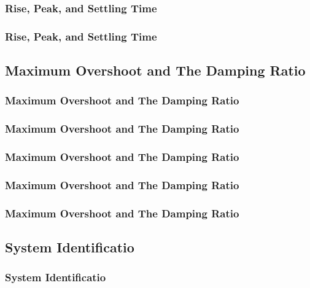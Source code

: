\documentclass[fleqn]{beamer} %
\newcommand{\sectionIVsubsectionIItitle}{Rise, Peak, and Settling Time}
\newcommand{\sectionIVsubsectionIIItitle}{Maximum Overshoot and The Damping Ratio}
\newcommand{\sectionIVsubsectionIVtitle}{System Identificatio}
\begin{document}
			\begin{frame}
				\frametitle{\sectionIVsubsectionIItitle}
				\bigskip


				\btVFill
			\end{frame}

			\begin{frame}
				\frametitle{\sectionIVsubsectionIItitle}
				\bigskip


				\btVFill
			\end{frame}

		\subsection{\sectionIVsubsectionIIItitle}\label{sectionIVsubsectionIV}

			\begin{frame}
				\frametitle{\sectionIVsubsectionIIItitle}
				\bigskip

				\btVFill
			\end{frame}

			\begin{frame}
				\frametitle{\sectionIVsubsectionIIItitle}
				\bigskip

			
				\btVFill
			\end{frame}

			\begin{frame}
				\frametitle{\sectionIVsubsectionIIItitle}
				\bigskip


				\btVFill
			\end{frame}

			\begin{frame}
				\frametitle{\sectionIVsubsectionIIItitle}
			
				\btVFill
			\end{frame}

			\begin{frame}
				\frametitle{\sectionIVsubsectionIIItitle}
				\bigskip


				\btVFill
			\end{frame}

		\subsection{\sectionIVsubsectionIVtitle}\label{sectionIVsubsectionIV}	

			\begin{frame}
				\frametitle{\sectionIVsubsectionIVtitle}
				\bigskip



				

				\btVFill 
			\end{frame}
\end{document}
